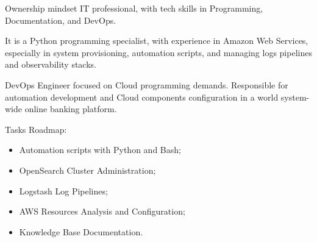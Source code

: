 \documentclass[10pt,a4paper]{altacv}
\begin{document}



\begin{fullwidth}
    \makecvheader
\end{fullwidth}



Ownership mindset IT professional, with tech skills in Programming, Documentation, and DevOps.

\bigskip

It is a Python programming specialist, with experience in Amazon Web Services, especially in system provisioning, automation scripts, and managing logs pipelines and observability stacks.



DevOps Engineer focused on Cloud programming demands. Responsible for automation development and Cloud components configuration in a world system-wide online banking platform.

\bigskip

Tasks Roadmap:

\bigskip

\begin{itemize}
    \item Automation scripts with Python and Bash;
    \item OpenSearch Cluster Administration;
    \item Logstash Log Pipelines;
    \item AWS Resources Analysis and Configuration;
    \item Knowledge Base Documentation.
\end{itemize}    

\divider

\end{document}

